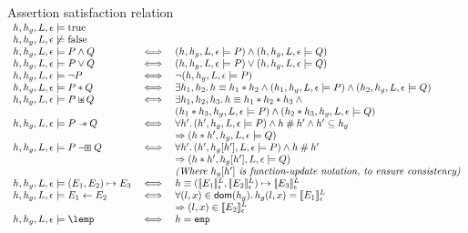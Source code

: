 \documentclass[a4paper]{article}
\begin{document}
\begin{display}{Assertion satisfaction relation}
  $\begin{array}{lcl}
    h,h_g,L,\env \satisfies \true \\
    h,h_g,L,\env \not\satisfies \false \\
    h,h_g,L,\env \satisfies P \land Q & \iff & (h,h_g,L,\env \satisfies
      P) \land (h,h_g,L,\env \satisfies Q) \\
    h,h_g,L,\env \satisfies P \lor Q & \iff & (h,h_g,L,\env \satisfies
      P) \lor (h,h_g,L,\env \satisfies Q) \\
    h,h_g,L,\env \satisfies \lnot P & \iff & \lnot(h,h_g,L,\env
      \satisfies P)\\
    h,h_g,L,\env \satisfies P \sep Q & \iff & \exists h_1,h_2 \st h \equiv h_1
      \sep h_2 \land (h_1,h_g,L,\env \satisfies P) \land (h_2,h_g,L,\env
      \satisfies Q) \\
    h,h_g,L,\env \satisfies P \sepish Q & \iff & \exists h_1,h_2,h_3 \st
      h \equiv h_1 \disju h_2 \disju h_3 \land {} \\
      && (h_1 \disju h_3, h_g, L, \env \satisfies P) \land
      (h_2 \disju h_3, h_g, L, \env \satisfies Q) \\
    h,h_g,L,\env \satisfies P \wand Q & \iff & \forall h' \st
      (h',h_g,L,\env \satisfies P) \land h \disj h' \land h' \subseteq h_g  \\
      & & \impl (h \disju h', h_g, L, \env \satisfies Q) \\
    h,h_g,L,\env \satisfies P \hysep Q & \iff &
      \forall h' \st (h',h_g[h'],L,\env \satisfies P) \land h \disj h' \\
      & & \impl (h \disju h', h_g[h'], L, \env \satisfies Q) \\
      & & \text{\emph{(Where $h_g[h']$ is function-update notation, to ensure
          consistency)}} \\
    h,h_g,L,\env \satisfies (E_1,E_2) \pointsto E_3 & \iff &
      h \equiv (\evalle{E_1}, \evalle{E_2}) \pointsto \evalle{E_3} \\
    h,h_g,L,\env \satisfies E_1 \bp E_2 & \iff & \forall (l,x) \in \dom(h_g) \st
      h_g(l,x) = \evalle{E_1} \\
      & & \impl (l,x) \in \evalle{E_2} \\
    h,h_g,L,\env \satisfies \lemp & \iff & h = \emp
  \end{array}$
\end{display}
\end{document}
